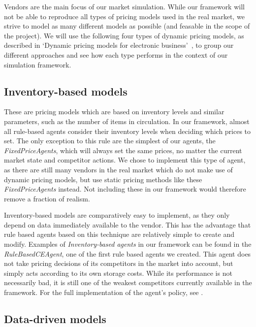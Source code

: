 Vendors are the main focus of our market simulation. While our framework will not be able to reproduce all types of pricing models used in the real market, we strive to model as many different models as possible (and feasable in the scope of the project). We will use the following four types of dynamic pricing models, as described in `Dynamic pricing models for electronic business'~\cite{dynamicPricingModels}, to group our different approaches and see how each type performs in the context of our simulation framework.

\subsection*{Inventory-based models}

These are pricing models which are based on inventory levels and similar parameters, such as the number of items in circulation. In our framework, almost all rule-based agents consider their inventory levels when deciding which prices to set. The only exception to this rule are the simplest of our agents, the \emph{FixedPriceAgents}, which will always set the same prices, no matter the current market state and competitor actions. We chose to implement this type of agent, as there are still many vendors in the real market which do not make use of dynamic pricing models, but use static pricing methods like these \emph{FixedPriceAgents} instead. Not including these in our framework would therefore remove a fraction of realism.

Inventory-based models are comparatively easy to implement, as they only depend on data immediately available to the vendor. This has the advantage that rule based agents based on this technique are relatively simple to create and modify. Examples of \emph{Inventory-based agents} in our framework can be found in the \emph{RuleBasedCEAgent}, one of the first rule based agents we created. This agent does not take pricing decisions of its competitors in the market into account, but simply acts according to its own storage costs. While its performance is not necessarily bad, it is still one of the weakest competitors currently available in the framework. For the full implementation of the agent's policy, see .

\subsection*{Data-driven models}

